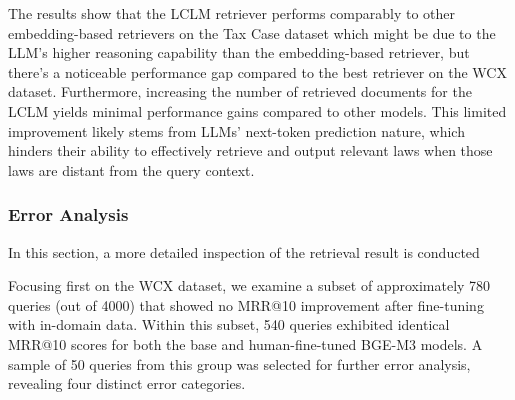 The results show that the LCLM retriever performs comparably to other embedding-based retrievers on the Tax Case dataset which might be due to the LLM's higher reasoning capability than the embedding-based retriever, but there's a noticeable performance gap compared to the best retriever on the WCX dataset. Furthermore, increasing the number of retrieved documents for the LCLM yields minimal performance gains compared to other models. This limited improvement likely stems from LLMs' next-token prediction nature, which hinders their ability to effectively retrieve and output relevant laws when those laws are distant from the query context.

\subsubsection{Error Analysis}
\label{subsubsec:re_result_discussion}
In this section, a more detailed inspection of the retrieval result is conducted



Focusing first on the WCX dataset, we examine a subset of approximately 780 queries (out of 4000) that showed no MRR@10 improvement after fine-tuning with in-domain data. Within this subset, 540 queries exhibited identical MRR@10 scores for both the base and human-fine-tuned BGE-M3 models. A sample of 50 queries from this group was selected for further error analysis, revealing four distinct error categories.

